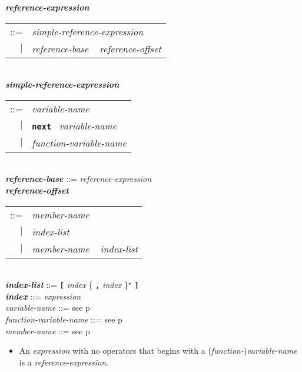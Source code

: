 \documentclass[12pt]{article}
\newcommand{\TT}[1]{{\tt \bfseries #1}}
\newcommand{\STAR}{{\Large $^\star$}}
\newcommand{\emkey}[1]{{\em \bfseries #1}}
\newcommand{\pagref}[1]{p\pageref{#1}}
\newenvironment{indpar}[1][0.3in]%
	{\begin{list}{}%
		     {\setlength{\itemsep}{0in}%
		      \setlength{\topsep}{0in}%
		      \setlength{\parsep}{1ex}%
		      \setlength{\labelwidth}{#1}%
		      \setlength{\leftmargin}{#1}%
		      \addtolength{\leftmargin}{\labelsep}}%
	 \item}%
	{\end{list}}
\begin{document}
\begin{indpar}
\emkey{reference-expression}\label{REFERENCE-EXPRESSION}
    \begin{tabular}[t]{rl}
    ::= & {\em simple-reference-expression} \\
    $|$ & {\em reference-base} ~ {\em reference-offset} \\
    \end{tabular}
\\[0.5ex]
\emkey{simple-reference-expression}\label{SIMPLE-REFERENCE-EXPRESSION}
    \begin{tabular}[t]{rl}
    ::= & {\em variable-name} \\
    $|$ & \TT{next}~ {\em variable-name} \\
    $|$ & {\em function-variable-name} \\
    \end{tabular}
\\[0.5ex]
\emkey{reference-base}\label{REFERENCE-BASE}
    ::= {\em reference-expression}
\\[0.5ex]
\emkey{reference-offset}\label{REFERENCE-OFFSET}
    \begin{tabular}[t]{rl}
    ::= & {\em member-name} \\
    $|$ & {\em index-list} \\
    $|$ & {\em member-name} ~ {\em index-list} \\
    \end{tabular}
\\[0.5ex]
\emkey{index-list} ::= \TT{[} {\em index} \{ \TT{,} {\em index} \}\STAR{} \TT{]}
\\[0.5ex]
\emkey{index}\label{REFERENCE-INDEX}
    ::= {\em expression}
\\[0.5ex]
{\em variable-name} ::= see \pagref{VARIABLE-NAME}
\\[0.5ex]
{\em function-variable-name} ::= see \pagref{FUNCTION-VARIABLE-NAME}
\\[0.5ex]
{\em member-name} ::= see \pagref{MEMBER-NAME}
\begin{itemize}
\item
An {\em expression} with no operators that begins
with a ({\em function-}){\em variable-name}
is a {\em reference-expression}.


\end{itemize}
\end{indpar}
\end{document}
